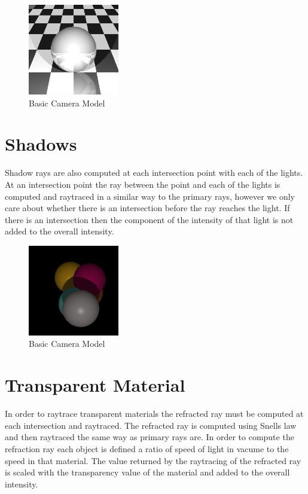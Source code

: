 \documentclass{article}
\begin{document}
\begin{figure}[H]
  \begin{center}
  \includegraphics[width=150px]{Images/gridSphere.png}
  \caption{Basic Camera Model}
  \label{fig:basiccammod}
  \end{center}
\end{figure}

\section{Shadows}

Shadow rays are also computed at each intersection point with each of the lights.
At an intersection point the ray between the point and each of the lights is computed
and raytraced in a similar way to the primary rays, however we only care about whether
there is an intersection before the ray reaches the light. If there is an intersection
then the component of the intensity of that light is not added to the overall intensity.

\begin{figure}[H]
  \begin{center}
  \includegraphics[width=150px]{Images/shadows.png}
  \caption{Basic Camera Model}
  \label{fig:basiccammod}
  \end{center}
\end{figure}

\section{Transparent Material}

In order to raytrace transparent materials the refracted ray must be computed at
each intersection and raytraced. The refracted ray is computed using Snells law
and then raytraced the same way as primary rays are. In order to compute the refraction
ray each object is defined a ratio of speed of light in vacume to the speed in that
material. The value returned by the raytracing of the refracted ray is
scaled with the transparency value of the material and added to the overall intensity.
\end{document}
